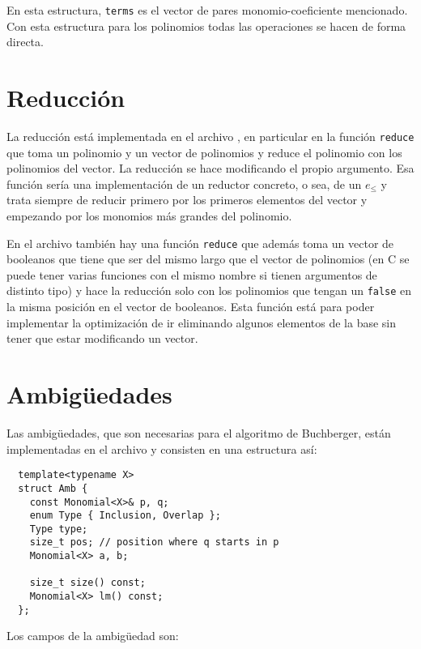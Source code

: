 \documentclass[12pt]{report}
\theoremstyle{customstyle}
\theoremstyle{factstyle}
\newcommand\cpp{C\nolinebreak[4]\hspace{-.05em}\raisebox{.4ex}{\relsize{-3}{\textbf{++}}}\xspace}
\begin{document}
En esta estructura, \texttt{terms} es el vector de pares monomio-coeficiente mencionado. Con esta estructura para los polinomios todas las operaciones se hacen de forma directa.

\section{Reducción}

La reducción está implementada en el archivo , en particular en la función \texttt{reduce} que toma un polinomio y un vector de polinomios y reduce el polinomio con los polinomios del vector. La reducción se hace modificando el propio argumento. Esa función sería una implementación de un reductor concreto, o sea, de un $e_≤$ y trata siempre de reducir primero por los primeros elementos del vector y empezando por los monomios más grandes del polinomio.

En el archivo también hay una función \texttt{reduce} que además toma un vector de booleanos que tiene que ser del mismo largo que el vector de polinomios (en \cpp se puede tener varias funciones con el mismo nombre si tienen argumentos de distinto tipo) y hace la reducción solo con los polinomios que tengan un \texttt{false} en la misma posición en el vector de booleanos. Esta función está para poder implementar la optimización de ir eliminando algunos elementos de la base sin tener que estar modificando un vector.

\section{Ambigüedades}

Las ambigüedades, que son necesarias para el algoritmo de Buchberger, están implementadas en el archivo  y consisten en una estructura así:

\begin{verbatim}
  template<typename X>
  struct Amb {
    const Monomial<X>& p, q;
    enum Type { Inclusion, Overlap };
    Type type;
    size_t pos; // position where q starts in p
    Monomial<X> a, b;

    size_t size() const;
    Monomial<X> lm() const;
  };
\end{verbatim}

Los campos de la ambigüedad son:
\end{document}
